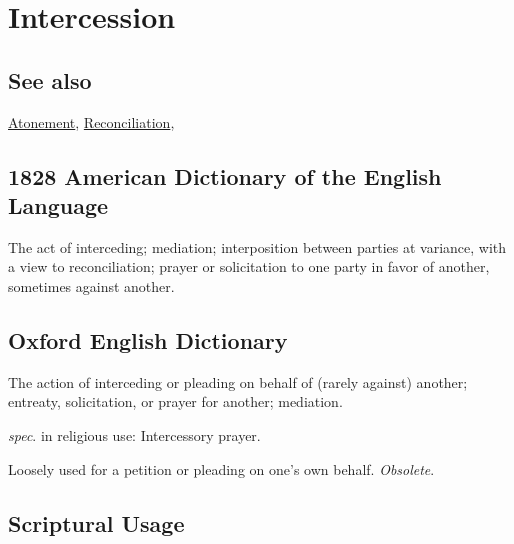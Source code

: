 \section{Intercession}
	\label{INTERCESSION}
	
\subsection{See also}

	\hyperref[ATONEMENT]{Atonement}, \hyperref[RECONCILIATION]{Reconciliation},

\subsection{1828 American Dictionary of the English Language} %
	\label{INTERCESSION-1828}

	\begin{compactenum}
		\item The act of interceding; mediation; interposition between parties at variance, with a view to reconciliation; prayer or solicitation to one party in favor of another, sometimes against another.
	\end{compactenum}

\subsection{Oxford English Dictionary} %
	\label{INTERCESSION-OED}

	\begin{compactitem}
		\item[I.1.a] The action of interceding or pleading on behalf of (rarely against) another; entreaty, solicitation, or prayer for another; mediation.
		\item[I.1.b.] \textit{spec}. in religious use: Intercessory prayer.
		\item[I.1.b.] Loosely used for a petition or pleading on one's own behalf. \textit{Obsolete}.
	\end{compactitem}

\subsection{Scriptural Usage} %
	\label{INTERCESSION-SCRIPTURES}

